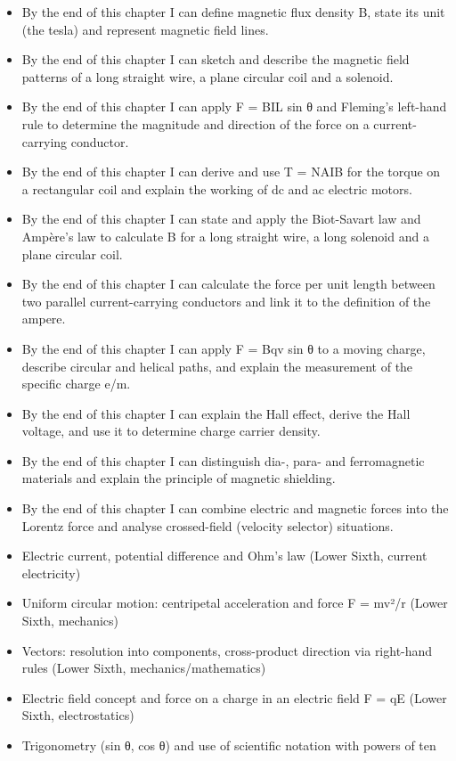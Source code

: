 \documentclass[11pt]{article}
\begin{document}
\begin{objectifs}
\begin{itemize}
\item By the end of this chapter I can define magnetic flux density B, state its unit (the tesla) and represent magnetic field lines.
\item By the end of this chapter I can sketch and describe the magnetic field patterns of a long straight wire, a plane circular coil and a solenoid.
\item By the end of this chapter I can apply F = BIL sin θ and Fleming's left-hand rule to determine the magnitude and direction of the force on a current-carrying conductor.
\item By the end of this chapter I can derive and use T = NAIB for the torque on a rectangular coil and explain the working of dc and ac electric motors.
\item By the end of this chapter I can state and apply the Biot-Savart law and Ampère's law to calculate B for a long straight wire, a long solenoid and a plane circular coil.
\item By the end of this chapter I can calculate the force per unit length between two parallel current-carrying conductors and link it to the definition of the ampere.
\item By the end of this chapter I can apply F = Bqv sin θ to a moving charge, describe circular and helical paths, and explain the measurement of the specific charge e/m.
\item By the end of this chapter I can explain the Hall effect, derive the Hall voltage, and use it to determine charge carrier density.
\item By the end of this chapter I can distinguish dia-, para- and ferromagnetic materials and explain the principle of magnetic shielding.
\item By the end of this chapter I can combine electric and magnetic forces into the Lorentz force and analyse crossed-field (velocity selector) situations.
\end{itemize}
\end{objectifs}

\begin{prerequis}
\begin{itemize}
\item Electric current, potential difference and Ohm's law (Lower Sixth, current electricity)
\item Uniform circular motion: centripetal acceleration and force F = mv²/r (Lower Sixth, mechanics)
\item Vectors: resolution into components, cross-product direction via right-hand rules (Lower Sixth, mechanics/mathematics)
\item Electric field concept and force on a charge in an electric field F = qE (Lower Sixth, electrostatics)
\item Trigonometry (sin θ, cos θ) and use of scientific notation with powers of ten
\end{itemize}
\end{prerequis}
\end{document}
